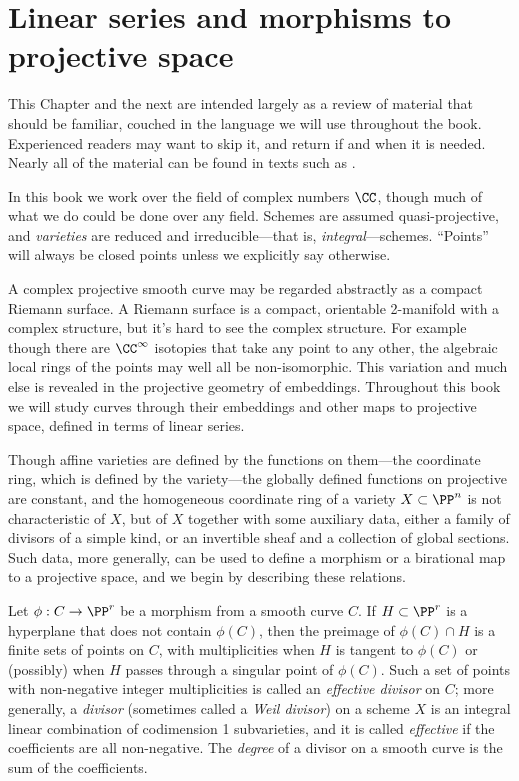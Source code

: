 

\chapter{Linear series and morphisms to projective space}\label{linear series}

This Chapter and the next are intended largely as a review of material that should be familiar, couched in the language we will use throughout the book. Experienced readers 
may want to skip it, and return if and when it is needed. Nearly all of the material can be found in texts such as \cite{H}.


In this book we work over the field of complex numbers $\CC$, though much of what we do
could be done over any field. 
Schemes are assumed quasi-projective, and \emph{varieties} are reduced and irreducible---that is, \emph{integral}---schemes. ``Points'' will always be closed points unless we explicitly say otherwise.

A complex projective smooth curve may  be regarded abstractly as a compact Riemann surface. A Riemann surface is a compact, orientable 2-manifold with a complex structure, but it's hard to see the complex structure. For example though there
are $\CC^\infty$ isotopies that take any point to any other, the algebraic local rings of the points may well all be non-isomorphic. This variation and much else is revealed in the projective geometry of embeddings. Throughout this book we will study curves through their embeddings and other maps to projective space, defined in terms of linear series. 

Though affine varieties are defined by the functions on them---the coordinate ring, which is defined by the variety---the globally defined functions on projective are constant, and
the homogeneous coordinate ring of a variety $X\subset \PP^n$ is not characteristic of $X$, but of $X$ together with some auxiliary data, 
either a family of divisors of a simple kind, or an invertible sheaf and a collection of global sections. Such data, more generally, can be used to define a morphism or a birational map
to a projective space, and we begin by describing these relations.

Let $\phi: C\to \PP^{r}$ be a morphism from a smooth curve $C$. If $H\subset \PP^r$ is a hyperplane that does not contain $\phi(C)$, then the preimage of $\phi(C)\cap H$ is a finite sets of points on $C$, with multiplicities when $H$ is tangent to $\phi(C)$ or (possibly) when $H$ passes through a singular point of $\phi(C)$. Such a set of points with non-negative integer multiplicities is called an \emph{effective divisor} on $C$; more generally, a \emph{divisor} (sometimes called a \emph{Weil divisor}) on a scheme $X$ is an integral linear combination of codimension 1 subvarieties, and it is called \emph{effective} if the coefficients are all non-negative. The \emph{degree} of a divisor on a smooth curve
is the sum of the coefficients. 

